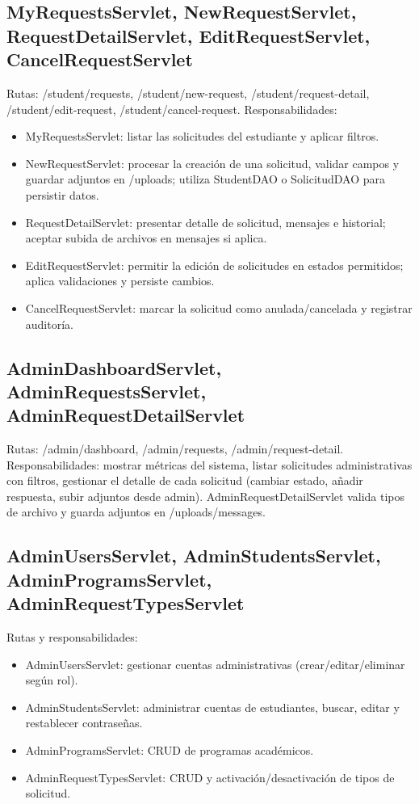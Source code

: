 \documentclass[12pt,letterpaper]{article}
\newcommand{\code}[1]{\texorpdfstring{\begingroup\normalfont\normalsize\def\_{\textunderscore\allowbreak}#1\endgroup}{#1}}
\begin{document}
\subsection*{MyRequestsServlet, NewRequestServlet, RequestDetailServlet, EditRequestServlet, CancelRequestServlet}
Rutas: \code{/student/requests}, \code{/student/new-request}, \code{/student/request-detail}, \code{/student/edit-request}, \code{/student/cancel-request}.
Responsabilidades:
\begin{itemize}
    \item \code{MyRequestsServlet}: listar las solicitudes del estudiante y aplicar filtros.
    \item \code{NewRequestServlet}: procesar la creación de una solicitud, validar campos y guardar adjuntos en \code{/uploads}; utiliza \code{StudentDAO} o \code{SolicitudDAO} para persistir datos.
    \item \code{RequestDetailServlet}: presentar detalle de solicitud, mensajes e historial; aceptar subida de archivos en mensajes si aplica.
    \item \code{EditRequestServlet}: permitir la edición de solicitudes en estados permitidos; aplica validaciones y persiste cambios.
    \item \code{CancelRequestServlet}: marcar la solicitud como anulada/cancelada y registrar auditoría.
\end{itemize}

\subsection*{AdminDashboardServlet, AdminRequestsServlet, AdminRequestDetailServlet}
Rutas: \code{/admin/dashboard}, \code{/admin/requests}, \code{/admin/request-detail}.
Responsabilidades: mostrar métricas del sistema, listar solicitudes administrativas con filtros, gestionar el detalle de cada solicitud (cambiar estado, añadir respuesta, subir adjuntos desde admin). \code{AdminRequestDetailServlet} valida tipos de archivo y guarda adjuntos en \code{/uploads/messages}.

\subsection*{AdminUsersServlet, AdminStudentsServlet, AdminProgramsServlet, AdminRequestTypesServlet}
Rutas y responsabilidades:
\begin{itemize}
    \item \code{AdminUsersServlet}: gestionar cuentas administrativas (crear/editar/eliminar según rol).
    \item \code{AdminStudentsServlet}: administrar cuentas de estudiantes, buscar, editar y restablecer contraseñas.
    \item \code{AdminProgramsServlet}: CRUD de programas académicos.
    \item \code{AdminRequestTypesServlet}: CRUD y activación/desactivación de tipos de solicitud.
\end{itemize}
\end{document}
